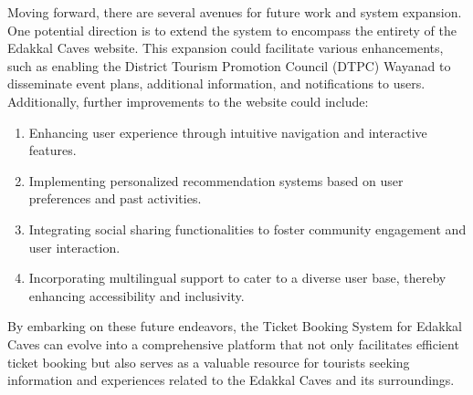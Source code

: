 \documentclass[12pt,a4paper]{report}
\begin{document}
Moving forward, there are several avenues for future work and system expansion. One potential direction is to extend the system to encompass the entirety of the Edakkal Caves website. This expansion could facilitate various enhancements, such as enabling the District Tourism Promotion Council (DTPC) Wayanad to disseminate event plans, additional information, and notifications to users. Additionally, further improvements to the website could include:
\begin{enumerate}
    \item Enhancing user experience through intuitive navigation and interactive features.
    \item Implementing personalized recommendation systems based on user preferences and past activities.
    \item Integrating social sharing functionalities to foster community engagement and user interaction.
    \item Incorporating multilingual support to cater to a diverse user base, thereby enhancing accessibility and inclusivity.
\end{enumerate}

By embarking on these future endeavors, the Ticket Booking System for Edakkal Caves can evolve into a comprehensive platform that not only facilitates efficient ticket booking but also serves as a valuable resource for tourists seeking information and experiences related to the Edakkal Caves and its surroundings.

\newpage
{}
\setcounter{page}{6}
\nocite{*}

\end{document}
